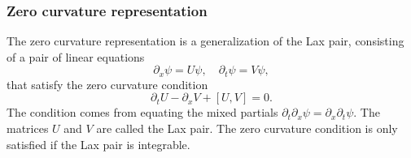 \documentclass[english,master]{liumaiex}
\theoremstyle{plain}
\theoremstyle{definition}
\begin{document}
\subsubsection*{Zero curvature representation}

The zero curvature representation is a generalization of the Lax pair, consisting of a pair of linear equations
\begin{equation}
	\partial_x \psi = U \psi, \quad \partial_t \psi = V \psi,
\end{equation}
that satisfy the zero curvature condition
\begin{equation}
	\partial_t U - \partial_x V + [U, V] = 0.
\end{equation}
The condition comes from equating the mixed partials $\partial_t \partial_x \psi = \partial_x \partial_t \psi$. The matrices $U$ and $V$ are called the Lax pair. The zero curvature condition is only satisfied if the Lax pair is integrable. 
\end{document}
